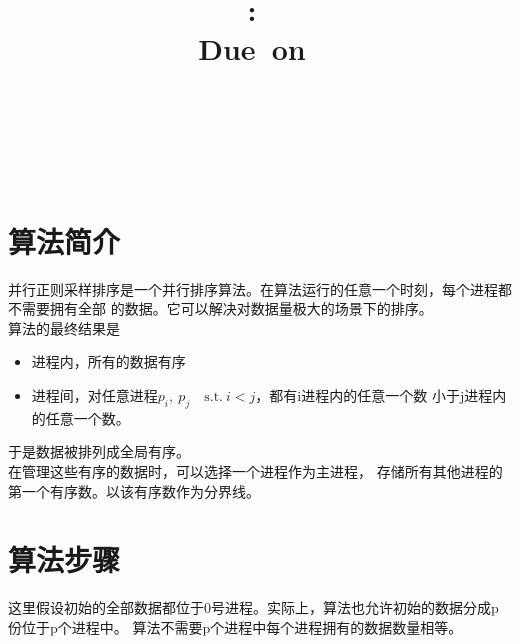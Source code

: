 \documentclass[a4paper]{article}
\title{
\vspace{2in}
\textmd{\textbf{\hmwkClass:\ \hmwkTitle}}\\
\normalsize\vspace{0.1in}\small{Due\ on\ \hmwkDueDate}\\
\vspace{0.1in}\large{\textit{\hmwkClassInstructor\ \hmwkClassTime}}
\vspace{3in}
}
\author{\textbf{\LARGE{\hmwkAuthorName}} \\ \\ \textbf{\LARGE{\hmwkAuthorId}}}
\date{} %
\begin{document}

\maketitle




\renewcommand{\contentsname}{Content} %
\newpage
\tableofcontents
{}
\newpage



\section{算法简介}
并行正则采样排序是一个并行排序算法。在算法运行的任意一个时刻，每个进程都不需要拥有全部
的数据。它可以解决对数据量极大的场景下的排序。\\

算法的最终结果是
\begin{itemize}
    \item 进程内，所有的数据有序
    \item 进程间，对任意进程$p_i,\ p_j\quad \text{s.t.}\ i < j$，都有i进程内的任意一个数
    小于j进程内的任意一个数。
\end{itemize}
于是数据被排列成全局有序。\\

在管理这些有序的数据时，可以选择一个进程作为主进程，
存储所有其他进程的第一个有序数。以该有序数作为分界线。
\section{算法步骤}
这里假设初始的全部数据都位于0号进程。实际上，算法也允许初始的数据分成p份位于p个进程中。
算法不需要p个进程中每个进程拥有的数据数量相等。\\
\end{document}

